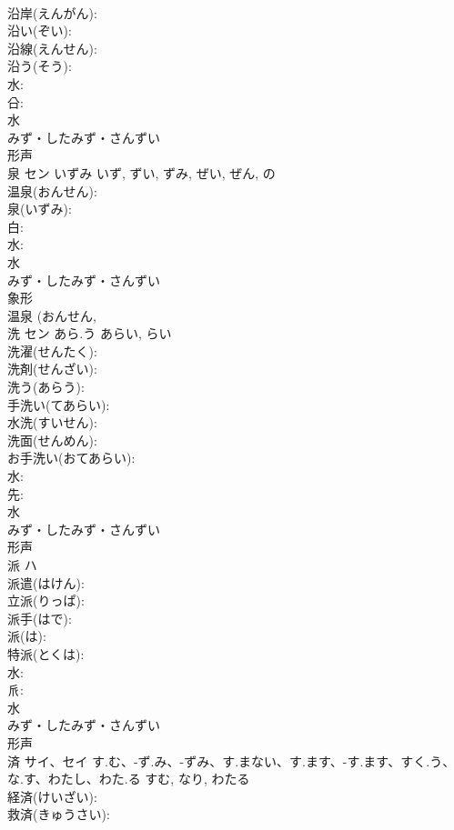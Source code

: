 \documentclass[8pt]{extreport}
\begin{document}
\begin{CJK}{UTF8}{min}
\\	沿岸(えんがん): 
\\	沿い(ぞい): 
\\	沿線(えんせん): 
\\	沿う(そう): 
\\	水: 
\\	㕣: 
\\	水	
\\	みず・したみず・さんずい	
\\	形声 
\\	泉	セン	いずみ	いず, ずい, ずみ, ぜい, ぜん, の	
\\	温泉(おんせん): 
\\	泉(いずみ): 
\\	白: 
\\	水: 
\\	水	
\\	みず・したみず・さんずい	
\\	象形 
\\	温泉 (おんせん, 
\\	洗	セン	あら.う	あらい, らい	
\\	洗濯(せんたく): 
\\	洗剤(せんざい): 
\\	洗う(あらう): 
\\	手洗い(てあらい): 
\\	水洗(すいせん): 
\\	洗面(せんめん): 
\\	お手洗い(おてあらい): 
\\	水: 
\\	先: 
\\	水	
\\	みず・したみず・さんずい	
\\	形声 
\\	派	ハ			
\\	派遣(はけん): 
\\	立派(りっぱ): 
\\	派手(はで): 
\\	派(は): 
\\	特派(とくは): 
\\	水: 
\\	𠂢: 
\\	水	
\\	みず・したみず・さんずい	
\\	形声 
\\	済	サイ、セイ	す.む、-ず.み、-ずみ、す.まない、す.ます、-す.ます、すく.う、な.す、わたし、わた.る	すむ, なり, わたる	
\\	経済(けいざい): 
\\	救済(きゅうさい): 

\end{CJK}
\end{document}

